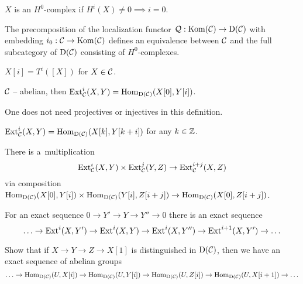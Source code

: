 



	\begin{definition}
		$X$ is an $H^0$-complex if $H^i(X) \neq 0 \implies i = 0$.
	\end{definition}
	
	\begin{theorem}
		The precomposition of the localization functor $\mathcal{Q} : \mathrm{Kom}(\mathcal{C}) \to \mathrm{D}(\mathcal{C})$
		with embedding $i_0: \mathcal{C} \to \mathrm{Kom}(\mathcal{C})$ defines an equivalence between $\mathcal{C}$
		and the full subcategory of $\mathrm{D}(\mathcal{C})$ consisting of $H^0$-complexes.
	\end{theorem}
	
	\begin{definition}
		$X[i] = T^i([X])$ for $X \in \mathcal{C}$.
	\end{definition}

	
	\begin{definition}
		$\mathcal{C}$ -- abelian, then $\mathrm{Ext}_{\mathcal{C}}^i(X,Y) = \mathrm{Hom}_{\mathrm{D}(\mathcal{C})}(X[0], Y[i])$.
	\end{definition}
	
	\begin{remark}
		One does not need projectives or injectives in this definition.
	\end{remark}
	
	\begin{remark}
		$\mathrm{Ext}_{\mathcal{C}}^i(X,Y) = \mathrm{Hom}_{\mathrm{D}(\mathcal{C})}(X[k], Y[k+i])$ for any $k \in {\mathbb{Z}}$.
	\end{remark}
	
	\begin{definition}[multiplication]
		There is a~multiplication 
		$$\mathrm{Ext}_{\mathcal{C}}^i(X,Y) \times \mathrm{Ext}_{\mathcal{C}}^j(Y,Z) \to \mathrm{Ext}_{\mathcal{C}}^{i+j}(X,Z)$$
		via composition
		$\mathrm{Hom}_{\mathrm{D}(\mathcal{C})}(X[0],Y[i]) \times \mathrm{Hom}_{\mathrm{D}(\mathcal{C})}(Y[i],Z[i+j])
		\to \mathrm{Hom}_{\mathrm{D}(\mathcal{C})}(X[0],Z[i+j])$.
	\end{definition}
	
	\begin{fact}
		For an exact sequence $0 \to Y' \to Y \to Y'' \to 0$ there is 
		an exact sequence
		$$\ldots\to \mathrm{Ext}^i(X,Y') \to \mathrm{Ext}^i(X,Y) \to \mathrm{Ext}^i(X,Y'') 
		\to \mathrm{Ext}^{i+1}(X,Y') \to \ldots$$
	\end{fact}
	
	\begin{exercise}
		Show that if $X \to Y \to Z \to X[1]$ is distinguished in $\mathrm{D}(\mathcal{C})$,
		then we have an exact sequence of abelian groups
		$$\ldots \to \mathrm{Hom}_{\mathrm{D}(\mathcal{C})}(U, X[i])
		\to \mathrm{Hom}_{\mathrm{D}(\mathcal{C})}(U, Y[i])
		\to \mathrm{Hom}_{\mathrm{D}(\mathcal{C})}(U, Z[i])
		\to \mathrm{Hom}_{\mathrm{D}(\mathcal{C})}(U, X[i+1]) \to \ldots$$
	\end{exercise}
	
